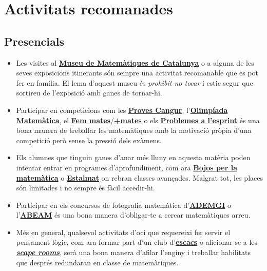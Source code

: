 \documentclass[a4paper, 12pt]{article}
\begin{document}
    \newpage %

    \section*{Activitats recomanades}

        \subsection*{Presencials}

            \begin{itemize}
                \item Les visites al \href{https://mmaca.cat/}{\textbf{Museu de Matemàtiques de Catalunya}} o a alguna de les seves exposicions itinerants són sempre una activitat recomanable que es pot fer en família. El lema d'aquest museu és \emph{prohibit no tocar} i estic segur que sortireu de l'exposició amb ganes de tornar-hi.
                \item Participar en competicions com les \href{https://www.cangur.org/}{\textbf{Proves Cangur}}, l'\href{https://www.cangur.org/olimpiades/}{\textbf{Olimpíada Matemàtica}}, el \href{https://fm.feemcat.org/}{\textbf{Fem mates}}/\href{https://sites.google.com/view/mesmates/inici}{\textbf{+mates}} o els \href{https://feemcat.org/category/activitats-alumnes/esprint/}{\textbf{Problemes a l'esprint}} és una bona manera de treballar les matemàtiques amb la motivació pròpia d'una competició però sense la pressió dels exàmens.
                \item Els alumnes que tinguin ganes d'anar més lluny en aquesta matèria poden intentar entrar en programes d'aprofundiment, com ara \href{https://feemcat.org/bojos/}{\textbf{Bojos per la matemàtica}} o \href{http://www.estalmat.cat/}{\textbf{Estalmat}} on rebran classes avançades. Malgrat tot, les places són limitades i no sempre és fàcil accedir-hi.
                \item Participar en els concursos de fotografia matemàtica d'\href{https://ademgi.feemcat.org/multimatge/}{\textbf{ADEMGI}} o l'\href{https://fotografiamatematica.cat/}{\textbf{ABEAM}} és una bona manera d'obligar-te a cercar matemàtiques arreu.
                \item Més en general, qualsevol activitats d'oci que requereixi fer servir el pensament lògic, com ara formar part d'un club d'\href{https://escacs.cat/}{\textbf{escacs}} o aficionar-se a les \href{https://ca.wikipedia.org/wiki/Joc_d\%27escapada_en_viu}{\textbf{\emph{scape rooms}}}, serà una bona manera d'afilar l'enginy i treballar habilitats que després redundaran en classe de matemàtiques.
            \end{itemize}
\end{document}
